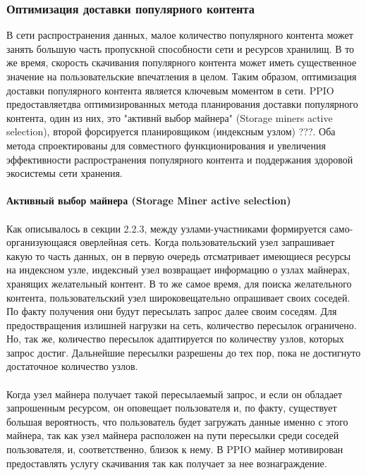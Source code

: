 \documentclass[10pt,a4paper]{article}
\begin{document}
\subsubsection{Оптимизация доставки популярного контента}  %
В сети распространения данных, малое количество популярного контента может занять большую часть пропускной способности сети и ресурсов хранилищ. В то же время, скорость скачивания популярного контента может иметь существенное значение на пользовательские впечатления в целом. Таким образом, оптимизация доставки популярного контента является ключевым моментом в сети. PPIO предоставляетдва оптимизированных метода планирования доставки популярного контента, один из них, это "активнй выбор майнера" (Storage miners active selection), второй форсируется планировщиком (индексным узлом) ???. Оба метода спроектированы для совместного функционирования и увеличения эффективности распространения популярного контента и поддержания здоровой экосистемы сети хранения.
\vspace{-0.5em}
\\ \\{\bf Активный выбор майнера (Storage Miner active selection)}
\vspace{-0.5em}
\\ \\Как описывалось в секции 2.2.3, между узлами-участниками формируется само-организующаяся оверлейная сеть. Когда пользовательский узел запрашивает какую то часть данных, он в первую очередь отсматривает имеющиеся ресурсы на индексном узле, индексный узел возвращает информацию о узлах майнерах, хранящих желательный контент. В то же самое время, для поиска желательного контента, пользовательский узел широковещательно опрашивает своих соседей. По факту получения они будут пересылать запрос далее своим соседям. Для предоствращения излишней нагрузки на сеть, количество пересылок ограничено. Но, так же, количество пересылок адаптируется по количеству узлов, которых запрос достиг. Дальнейшие пересылки разрешены до тех пор, пока не достигнуто достаточное количество узлов.
\vspace{-0.5em}
\\ \\Когда узел майнера получает такой пересылаемый запрос, и если он обладает запрошенным ресурсом, он оповещает пользователя и, по факту, существует большая вероятность, что пользователь будет загружать данные именно с этого майнера, так как узел майнера расположен на пути пересылки среди соседей пользователя, и, соответственно, близок к нему. В PPIO майнер мотивирован предоставлять услугу скачивания так как получает за нее вознаграждение.
\end{document}
